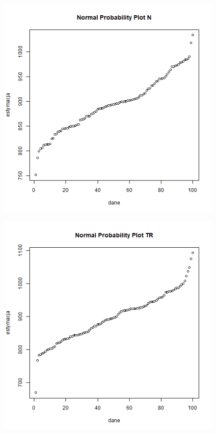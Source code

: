 \documentclass{article}
\begin{document}
\begin{figure}[h!]
\begin{center}
\includegraphics[height = 0.4\textheight, angle = 0]{"w10zad13_normPlot.png"}
\end{center} \end{figure} 

\newpage
\begin{figure}[h!]
\begin{center}
\includegraphics[height = 0.4\textheight, angle = 0]{"w10zad13_normPlot_TR.png"}
\end{center} \end{figure}
\end{document}
